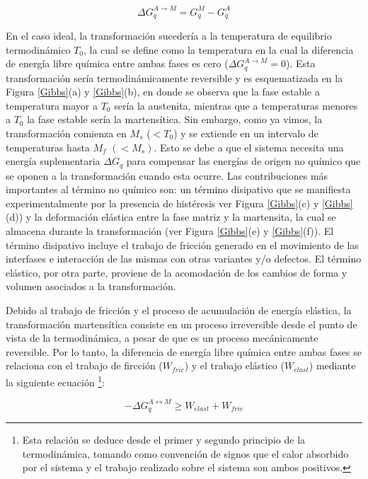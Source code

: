 \documentclass[12pt]{article}
\theoremstyle{definition}
\theoremstyle{remark}
\begin{document}
\begin{equation}
\Delta G^{A \rightarrow M}_q = G^M_q - G^A_q
\end{equation} 

En el caso ideal, la transformación sucedería a la temperatura de equilibrio termodinámico $T_0$, la cual se define como la temperatura en la cual la diferencia de energía libre química entre ambas fases es cero ($\Delta G^{A \rightarrow M}_q = 0$). Esta transformación sería termodinámicamente reversible y es esquematizada en la Figura \ref{Gibbs}(a) y \ref{Gibbs}(b), en donde se observa que la fase estable a temperatura mayor a $T_0$ sería la austenita, mientras que a temperaturas menores a $T_0$ la fase estable sería la martensítica. Sin embargo, como ya vimos, la transformación comienza en $M_s$  ($< T_0$) y se extiende en un intervalo de temperaturas hasta $M_f$  $(< M_s)$. Esto se debe a que el sistema necesita una energía suplementaria $\Delta G_q$ para compensar las energías de origen no químico que se oponen a la transformación cuando esta ocurre. Las contribuciones más importantes al término no químico son: un término disipativo que se manifiesta experimentalmente por la presencia de histéresis ver Figura \ref{Gibbs}(c) y \ref{Gibbs}(d)) y la deformación elástica entre la fase matriz y la martensita, la cual se almacena durante la transformación (ver Figura \ref{Gibbs}(e) y \ref{Gibbs}(f)). El término disipativo incluye el trabajo de fricción generado en el movimiento de las interfases e interacción de las mismas con otras variantes y/o defectos. El término elástico, por otra parte, proviene de la acomodación de los cambios de forma y volumen asociados a la transformación\citep{Wollants1993}.

Debido al trabajo de fricción y el proceso de acumulación de energía elástica, la transformación martensítica consiste en un proceso irreversible desde el punto de vista de la termodinámica, a pesar de que es un proceso mecánicamente reversible. Por lo tanto, la diferencia de energía libre química entre ambas fases se relaciona con el trabajo de fircción ($W_{fric}$) y el trabajo elástico ($W_{elast}$) mediante la siguiente ecuación \footnote{Esta relación se deduce desde el primer y segundo principio de la termodinámica, tomando como convención de signos que el calor absorbido por el sistema y el trabajo realizado sobre el sistema son ambos positivos.}\citep{Isola2020}:

\begin{equation}
\label{GibbsEnergyEquation}
	- \Delta G_{q}^{A \leftrightarrow M} \geq W_{elast} + W_{fric}
\end{equation}
\end{document}
